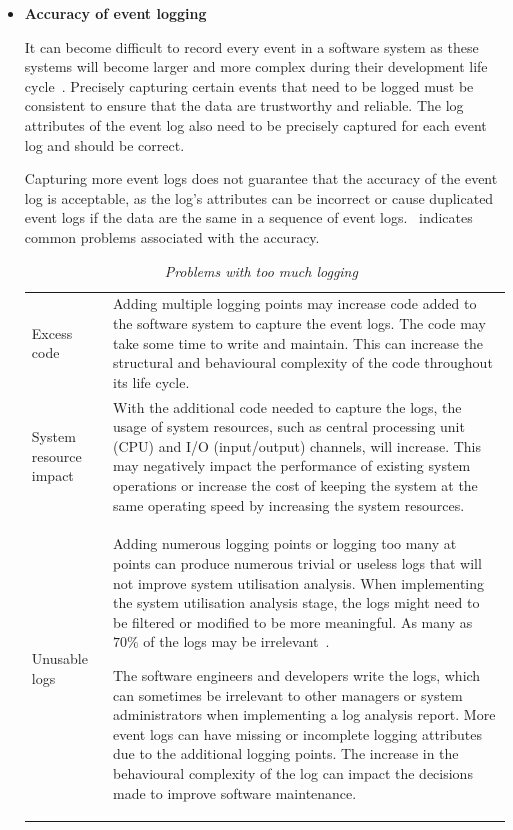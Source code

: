 \begin{itemize}
	\item \textbf{Accuracy of event logging}\par It can become difficult to record every event in a software system as these systems will become larger and more complex during their development life cycle~\cite{Stojanov2017}. Precisely capturing certain events that need to be logged must be consistent to ensure that the data are trustworthy and reliable. The log attributes of the event log also need to be precisely captured for each event log and should be correct.\par Capturing more event logs does not guarantee that the accuracy of the event log is acceptable, as the log's attributes can be incorrect or cause duplicated event logs if the data are the same in a sequence of event logs.~ indicates common problems associated with the accuracy.

	\begin{table}[!htb]
		\centering
		\caption[Problems with too much logging]
		{\textit{Problems with too much logging~\cite{Zhu2015}}}
		\label{tbl:ch1_loggingTooMuch}
		\begin{tabularx}{\linewidth}{p{3cm}X}
			\toprule 
			\thead{Problem}  & \thead{Description} \\
			\midrule

			\rowcolor{lightgray}
			Excess code & Adding multiple logging points may increase code added to the software system to capture the event logs. The code may take some time to write and maintain. This can increase the structural and behavioural complexity of the code throughout its life cycle. \\

			System resource impact & With the additional code needed to capture the logs, the usage of system resources, such as central processing unit (CPU) and I/O (input/output) channels, will increase. This may negatively impact the performance of existing system operations or increase the cost of keeping the system at the same operating speed by increasing the system resources.\\

			\rowcolor{lightgray}
			Unusable logs & Adding numerous logging points or logging too many at points can produce numerous trivial or useless logs that will not improve system utilisation analysis. When implementing the system utilisation analysis stage, the logs might need to be filtered or modified to be more meaningful. As many as $70\%$ of the logs may be irrelevant~\cite{Fedaghi2010}. \par The software engineers and developers write the logs, which can sometimes be irrelevant to other managers or system administrators when implementing a log analysis report. More event logs can have missing or incomplete logging attributes due to the additional logging points. The increase in the behavioural complexity of the log can impact the decisions made to improve software maintenance. \\
			\bottomrule
		\end{tabularx}
	\end{table}


\end{itemize}

